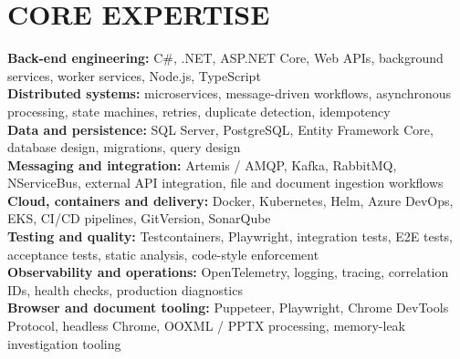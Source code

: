 \documentclass[letterpaper,11pt]{article}
\begin{document}
\section{CORE EXPERTISE}
\begin{itemize}[leftmargin=0in, label={}]
\small{\item{
\textbf{Back-end engineering:} C\#, .NET, ASP.NET Core, Web APIs, background services, worker services, Node.js, TypeScript \\
\textbf{Distributed systems:} microservices, message-driven workflows, asynchronous processing, state machines, retries, duplicate detection, idempotency \\
\textbf{Data and persistence:} SQL Server, PostgreSQL, Entity Framework Core, database design, migrations, query design \\
\textbf{Messaging and integration:} Artemis / AMQP, Kafka, RabbitMQ, NServiceBus, external API integration, file and document ingestion workflows \\
\textbf{Cloud, containers and delivery:} Docker, Kubernetes, Helm, Azure DevOps, EKS, CI/CD pipelines, GitVersion, SonarQube \\
\textbf{Testing and quality:} Testcontainers, Playwright, integration tests, E2E tests, acceptance tests, static analysis, code-style enforcement \\
\textbf{Observability and operations:} OpenTelemetry, logging, tracing, correlation IDs, health checks, production diagnostics \\
\textbf{Browser and document tooling:} Puppeteer, Playwright, Chrome DevTools Protocol, headless Chrome, OOXML / PPTX processing, memory-leak investigation tooling
}}
\end{itemize}
\end{document}
